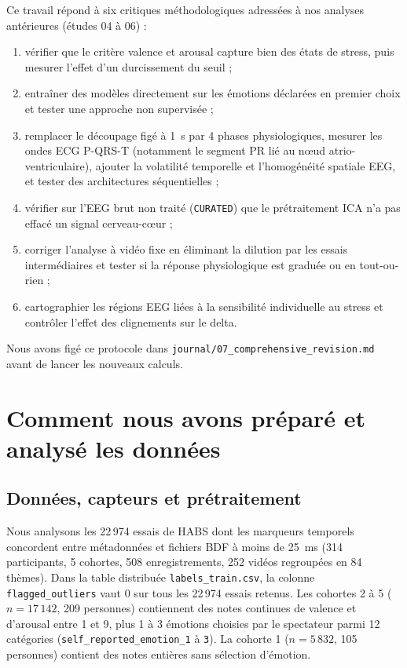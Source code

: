 \documentclass[10pt]{article}
\begin{document}
Ce travail répond à six critiques méthodologiques adressées à nos analyses antérieures (études 04 à 06) :
\begin{enumerate}
\item vérifier que le critère valence et arousal capture bien des états de stress, puis mesurer l'effet d'un durcissement du seuil ;
\item entraîner des modèles directement sur les émotions déclarées en premier choix et tester une approche non supervisée ;
\item remplacer le découpage figé à 1~s par 4 phases physiologiques, mesurer les ondes ECG P-QRS-T (notamment le segment PR lié au nœud atrio-ventriculaire), ajouter la volatilité temporelle et l'homogénéité spatiale EEG, et tester des architectures séquentielles ;
\item vérifier sur l'EEG brut non traité (\texttt{CURATED}) que le prétraitement ICA n'a pas effacé un signal cerveau-cœur ;
\item corriger l'analyse à vidéo fixe en éliminant la dilution par les essais intermédiaires et tester si la réponse physiologique est graduée ou en tout-ou-rien ;
\item cartographier les régions EEG liées à la sensibilité individuelle au stress et contrôler l'effet des clignements sur le delta.
\end{enumerate}

Nous avons figé ce protocole dans \texttt{journal/07\_comprehensive\_revision.md} avant de lancer les nouveaux calculs.

\section{Comment nous avons préparé et analysé les données}

\subsection{Données, capteurs et prétraitement}

Nous analysons les 22\,974 essais de HABS dont les marqueurs temporels concordent entre métadonnées et fichiers BDF à moins de 25~ms (314 participants, 5 cohortes, 508 enregistrements, 252 vidéos regroupées en 84 thèmes). Dans la table distribuée \texttt{labels\_train.csv}, la colonne \texttt{flagged\_outliers} vaut 0 sur tous les 22\,974 essais retenus. Les cohortes 2 à 5 ($n = 17\,142$, 209 personnes) contiennent des notes continues de valence et d'arousal entre 1 et 9, plus 1 à 3 émotions choisies par le spectateur parmi 12 catégories (\texttt{self\_reported\_emotion\_1} à \texttt{3}). La cohorte 1 ($n = 5\,832$, 105 personnes) contient des notes entières sans sélection d'émotion.
\end{document}
